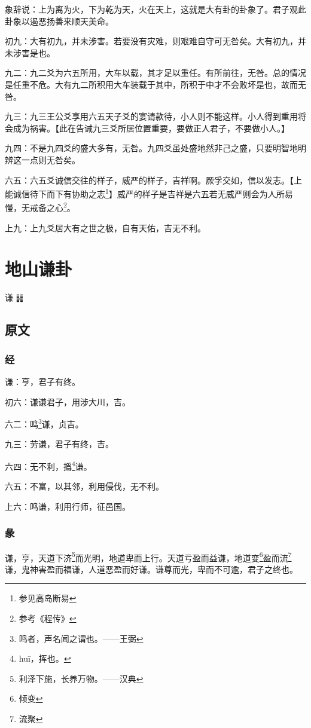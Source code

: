 \documentclass[12pt,oneside]{book}
\begin{document}
象辞说：上为离为火，下为乾为天，火在天上，这就是大有卦的卦象了。君子观此卦象以遏恶扬善来顺天美命。

初九：大有初九，并未涉害。若要没有灾难，则艰难自守可无咎矣。大有初九，并未涉害是也。

九二：九二爻为六五所用，大车以载，其才足以重任。有所前往，无咎。总的情况是任重不危。大有九二所积用大车装载于其中，所积于中才不会败坏是也，故而无咎。

九三：九三王公爻享用六五天子爻的宴请款待，小人则不能这样。小人得到重用将会成为祸害。【此在告诫九三爻所居位置重要，要做正人君子，不要做小人。】

九四：不是九四爻的盛大多有，无咎。九四爻虽处盛地然非己之盛，只要明智地明辨这一点则无咎矣。

六五：六五爻诚信交往的样子，威严的样子，吉祥啊。厥孚交如，信以发志。【上能诚信待下而下有协助之志\footnote{参见高岛断易}】威严的样子是吉祥是六五若无威严则会为人所易慢，无戒备之心\footnote{参考《程传》}。

上九：上九爻居大有之世之极，自有天佑，吉无不利。



\chapter{地山谦卦}
谦 {\Large ䷎}

\section{原文}

\subsection{经}
谦：亨，君子有终。

初六：谦谦君子，用涉大川，吉。

六二：鸣\footnote{鸣者，声名闻之谓也。——王弼}谦，贞吉。

九三：劳谦，君子有终，吉。

六四：无不利，撝\footnote{huī，挥也。}谦。

六五：不富，以其邻，利用侵伐，无不利。

上六：鸣谦，利用行师，征邑国。

\subsection{彖}
谦，亨，天道下济\footnote{利泽下施，长养万物。——汉典}而光明，地道卑而上行。天道亏盈而益谦，地道变\footnote{倾变}盈而流\footnote{流聚}谦，鬼神害盈而福谦，人道恶盈而好谦。谦尊而光，卑而不可逾，君子之终也。
\end{document}

